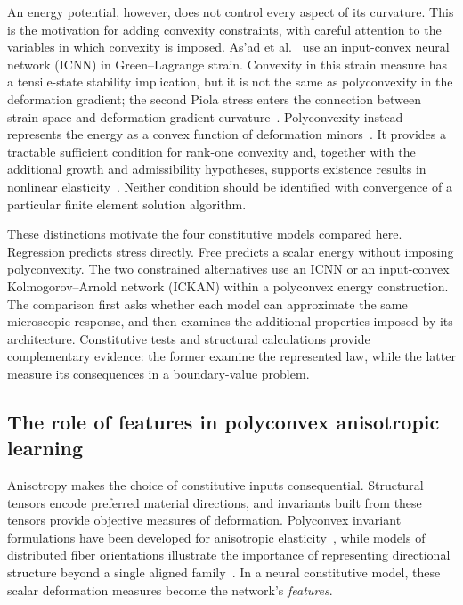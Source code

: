 An energy potential, however, does not control every aspect of its curvature. This is the motivation for adding convexity constraints, with careful attention to the variables in which convexity is imposed. As'ad et al.~\cite{asad2022} use an input-convex neural network (ICNN) in Green--Lagrange strain. Convexity in this strain measure has a tensile-state stability implication, but it is not the same as polyconvexity in the deformation gradient; the second Piola stress enters the connection between strain-space and deformation-gradient curvature~\cite{GaoNeffRoventaThiel2017}. Polyconvexity instead represents the energy as a convex function of deformation minors~\cite{ball1977}. It provides a tractable sufficient condition for rank-one convexity and, together with the additional growth and admissibility hypotheses, supports existence results in nonlinear elasticity~\cite{Ciarlet1988}. Neither condition should be identified with convergence of a particular finite element solution algorithm.

These distinctions motivate the four constitutive models compared here. Regression predicts stress directly. Free predicts a scalar energy without imposing polyconvexity. The two constrained alternatives use an ICNN or an input-convex Kolmogorov--Arnold network (ICKAN) within a polyconvex energy construction. The comparison first asks whether each model can approximate the same microscopic response, and then examines the additional properties imposed by its architecture. Constitutive tests and structural calculations provide complementary evidence: the former examine the represented law, while the latter measure its consequences in a boundary-value problem.

\subsection{The role of features in polyconvex anisotropic learning}
Anisotropy makes the choice of constitutive inputs consequential. Structural tensors encode preferred material directions, and invariants built from these tensors provide objective measures of deformation. Polyconvex invariant formulations have been developed for anisotropic elasticity~\cite{SchroderNeff2003}, while models of distributed fiber orientations illustrate the importance of representing directional structure beyond a single aligned family~\cite{Gasser2006}. In a neural constitutive model, these scalar deformation measures become the network's \emph{features}.

